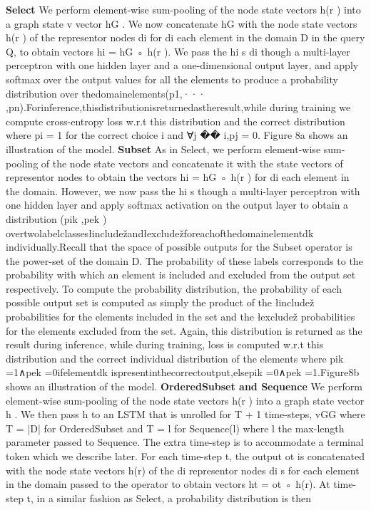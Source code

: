 \documentclass{article}
\begin{document}
\textbf{Select} We perform element-wise sum-pooling of the node state vectors h(r ) into a graph state v
vector hG . We now concatenate hG with the node state vectors h(r ) of the representor nodes di for di
each element in the domain D in the query Q, to obtain vectors hi = hG ◦ h(r ). We pass the hi s di
though a multi-layer perceptron with one hidden layer and a one-dimensional output layer, and apply softmax over the output values for all the elements to produce a probability distribution over thedomainelements(p1,··· ,pn).Forinference,thisdistributionisreturnedastheresult,while during training we compute cross-entropy loss w.r.t this distribution and the correct distribution where pi = 1 for the correct choice i and ∀j �� i,pj = 0. Figure 8a shows an illustration of the model.
\textbf{Subset} As in Select, we perform element-wise sum-pooling of the node state vectors and concatenate it with the state vectors of representor nodes to obtain the vectors hi = hG ◦ h(r ) for
di each element in the domain. However, we now pass the hi s though a multi-layer perceptron with
one hidden layer and apply softmax activation on the output layer to obtain a distribution (pik ,pek ) overtwolabelclassesłincludežandłexcludežforeachofthedomainelementdk individually.Recall that the space of possible outputs for the Subset operator is the power-set of the domain D. The probability of these labels corresponds to the probability with which an element is included and excluded from the output set respectively. To compute the probability distribution, the probability of each possible output set is computed as simply the product of the łincludež probabilities for the elements included in the set and the łexcludež probabilities for the elements excluded from the set. Again, this distribution is returned as the result during inference, while during training, loss is computed w.r.t this distribution and the correct individual distribution of the elements where pik =1∧pek =0ifelementdk ispresentinthecorrectoutput,elsepik =0∧pek =1.Figure8b shows an illustration of the model.
\textbf{OrderedSubset and Sequence} We perform element-wise sum-pooling of the node state vectors h(r ) into a graph state vector h . We then pass h to an LSTM that is unrolled for T + 1 time-steps,
vGG
where T = |D| for OrderedSubset and T = l for Sequence(l) where l the max-length parameter
passed to Sequence. The extra time-step is to accommodate a terminal token which we describe
later. For each time-step t, the output ot is concatenated with the node state vectors h(r) of the di
representor nodes di s for each element in the domain passed to the operator to obtain vectors ht = ot ◦ h(r). At time-step t, in a similar fashion as Select, a probability distribution is then
\end{document}
